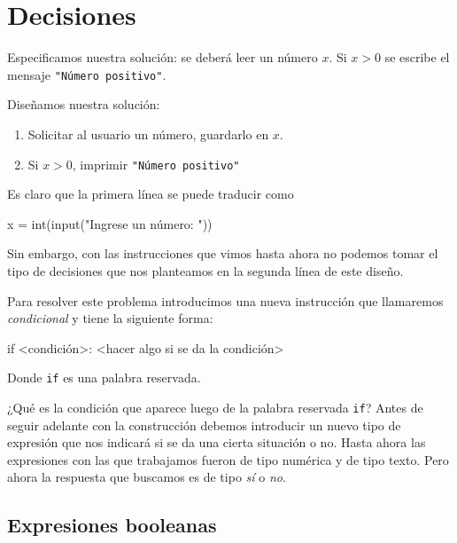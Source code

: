 \chapter{Decisiones}


\begin{solucion}
Especificamos nuestra solución: se deberá leer un número $x$.
Si $x > 0$ se escribe el mensaje \lstinline!"Número positivo"!.

Diseñamos nuestra solución:

\begin{enumerate}
\item Solicitar al usuario un número, guardarlo en $x$.
\item Si $x > 0$, imprimir \lstinline!"Número positivo"!
\end{enumerate}

Es claro que la primera línea se puede traducir como
\begin{codigo-python-sn}
    x = int(input("Ingrese un número: "))
\end{codigo-python-sn}

Sin embargo, con las instrucciones que vimos hasta ahora no podemos tomar
el tipo de decisiones que nos planteamos en la segunda línea de este
diseño.
\end{solucion}

Para resolver este problema introducimos una nueva instrucción que
llamaremos \emph{condicional} y tiene la siguiente forma:

\begin{codigo-python-sn}
if <condición>:
    <hacer algo si se da la condición>
\end{codigo-python-sn}

Donde \lstinline+if+ es una palabra reservada.

¿Qué es la condición que aparece luego de la palabra reservada \lstinline+if+?
Antes de seguir adelante con la construcción debemos introducir
un nuevo tipo de expresión que nos indicará si se da una cierta situación o no.
Hasta ahora las expresiones con las que trabajamos fueron de tipo numérica y de tipo texto.
Pero ahora la respuesta que buscamos es de tipo \emph{sí} o \emph{no}.

\section{Expresiones booleanas}

